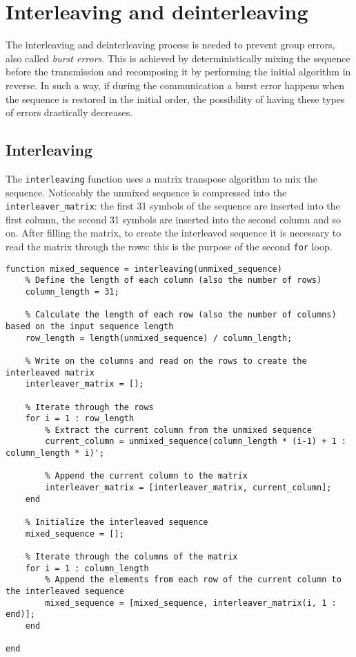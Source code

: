\vspace{40px} \section{Interleaving and deinterleaving}
The interleaving and deinterleaving process is needed to prevent group errors, also called \textsl{burst errors}. This is achieved by deterministically mixing the sequence before the transmission and recomposing it by performing the initial algorithm in reverse. In such a way, if during the communication a burst error happens when the sequence is restored in the initial order, the possibility of having these types of errors drastically decreases.


\subsection{Interleaving}
The \texttt{interleaving} function uses a matrix transpose algorithm to mix the sequence. Noticeably the unmixed sequence is compressed into the \texttt{interleaver\_matrix}: the first 31 symbols of the sequence are inserted into the first column, the second 31 symbols are inserted into the second column and so on. After filling the matrix, to create the interleaved sequence it is necessary to read the matrix through the rows: this is the purpose of the second \texttt{for} loop.

\begin{lstlisting}
function mixed_sequence = interleaving(unmixed_sequence)
    % Define the length of each column (also the number of rows)
    column_length = 31;

    % Calculate the length of each row (also the number of columns) based on the input sequence length
    row_length = length(unmixed_sequence) / column_length;

    % Write on the columns and read on the rows to create the interleaved matrix
    interleaver_matrix = [];

    % Iterate through the rows
    for i = 1 : row_length
        % Extract the current column from the unmixed sequence
        current_column = unmixed_sequence(column_length * (i-1) + 1 : column_length * i)';
        
        % Append the current column to the matrix
        interleaver_matrix = [interleaver_matrix, current_column];
    end
    
    % Initialize the interleaved sequence
    mixed_sequence = [];

    % Iterate through the columns of the matrix
    for i = 1 : column_length
        % Append the elements from each row of the current column to the interleaved sequence
        mixed_sequence = [mixed_sequence, interleaver_matrix(i, 1 : end)];
    end

end
\end{lstlisting}

